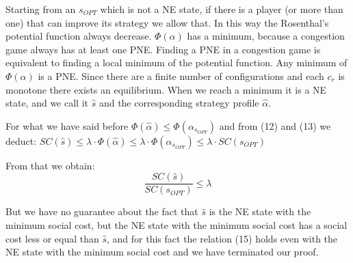 \documentclass[11pt]{article}
\theoremstyle{definition}
\begin{document}
Starting from an $s_{OPT}$ which is not a NE state, if there is a player (or more than one) that can improve its strategy we allow that. In this way the Rosenthal’s potential function always decrease. 
 $\Phi(\alpha)$ has a minimum, because a congestion game always has at least one PNE. Finding a PNE in a congestion game is equivalent to finding a local minimum of the potential function. Any minimum of $\Phi(\alpha)$ is a PNE. Since there are a finite number of configurations and each $c_{r}$ is monotone there exists an equilibrium. 
When we reach a minimum it is a NE state, and we call it $\hat{s}$ and the corresponding strategy profile $\hat{\alpha}$.

For what we have said before $\Phi(\hat{\alpha}) \le \Phi(\alpha_{s_{OPT}})$ and from (12) and (13)  we deduct:  $SC(\hat{s}) \le \lambda \cdot \Phi(\hat{\alpha}) \le \lambda \cdot \Phi(\alpha_{s_{OPT}}) \le \lambda \cdot SC(s_{OPT}) $

From that we obtain: \begin{equation} \frac{SC(\hat{s})} { SC(s_{OPT})} \le \lambda \end{equation}

But we have no guarantee about the fact that $\hat{s}$ is the NE state with the minimum social cost, but the NE state with the minimum social cost has a social cost less or equal than $\hat{s}$, and for this fact the relation (15) holds even with the NE state with the minimum social cost and we have terminated our proof.

\newpage
\end{document}
